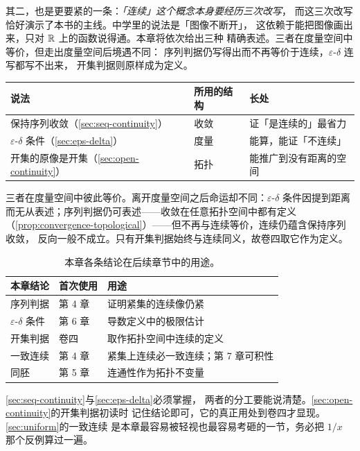 其二，也是更要紧的一条：\emph{「连续」这个概念本身要经历三次改写}，
而这三次改写恰好演示了本书的主线。中学里的说法是「图像不断开」，
这依赖于能把图像画出来，只对 \(\mathbb{R}\) 上的函数说得通。本章将依次给出三种
精确表述。三者在度量空间中等价，但走出度量空间后境遇不同：
序列判据仍写得出而不再等价于连续，\(\varepsilon\)-\(\delta\) 连写都写不出来，
开集判据则原样成为定义。

\begin{center}
\begin{tabular}{@{}lll@{}}
  \toprule
  说法 & 所用的结构 & 长处 \\
  \midrule
  保持序列收敛（\cref{sec:seq-continuity}） & 收敛 & 证「是连续的」最省力 \\
  \(\varepsilon\)-\(\delta\) 条件（\cref{sec:eps-delta}） & 度量 & 能算，能证「不连续」 \\
  开集的原像是开集（\cref{sec:open-continuity}） & 拓扑 & 能推广到没有距离的空间 \\
  \bottomrule
\end{tabular}
\end{center}

三者在度量空间中彼此等价。离开度量空间之后命运却不同：\(\varepsilon\)-\(\delta\)
条件因提到距离而无从表述；序列判据仍可表述——收敛在任意拓扑空间中都有定义
（\cref{prop:convergence-topological}）——但不再与连续等价，连续仍蕴含保持序列收敛，
反向一般不成立。只有开集判据始终与连续同义，故卷四取它作为定义。

\begin{table}[htbp]
  \centering
  \caption{本章各条结论在后续章节中的用途。}
  \label{tab:ch3-where-used}
  \begin{tabular}{@{}lll@{}}
    \toprule
    本章结论 & 首次使用 & 用途 \\
    \midrule
    序列判据       & 第 4 章 & 证明紧集的连续像仍紧 \\
    \(\varepsilon\)-\(\delta\) 条件 & 第 6 章 & 导数定义中的极限估计 \\
    开集判据       & 卷四     & 取作拓扑空间中连续的定义 \\
    一致连续       & 第 4 章 & 紧集上连续必一致连续；第 7 章可积性 \\
    同胚           & 第 5 章 & 连通性作为拓扑不变量 \\
    \bottomrule
  \end{tabular}
\end{table}

\begin{remark}[读法建议]
  \cref{sec:seq-continuity}与\cref{sec:eps-delta}必须掌握，
  两者的分工要能说清楚。\cref{sec:open-continuity}的开集判据初读时
  记住结论即可，它的真正用处到卷四才显现。\cref{sec:uniform}的一致连续
  是本章最容易被轻视也最容易考砸的一节，务必把 \(1/x\) 那个反例算过一遍。
\end{remark}

